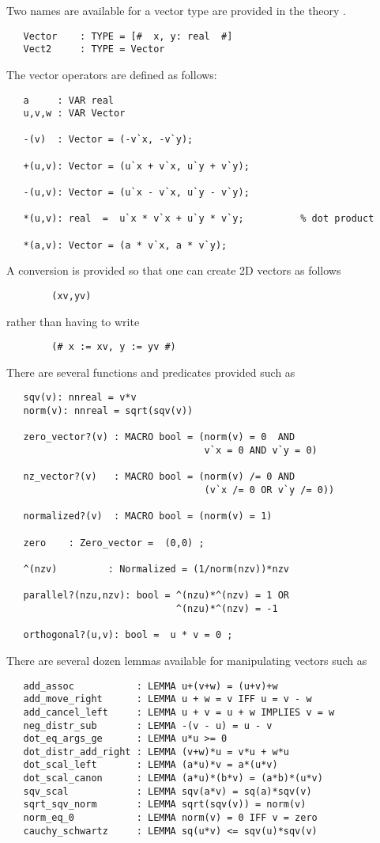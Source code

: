 \documentclass[12pt]{article}
\begin{document}
Two names are available for a vector type are provided in the theory
.
\begin{verbatim}
   Vector    : TYPE = [#  x, y: real  #]
   Vect2     : TYPE = Vector
\end{verbatim}
The vector operators are defined as follows:
\begin{verbatim}
   a     : VAR real
   u,v,w : VAR Vector

   -(v)  : Vector = (-v`x, -v`y); 

   +(u,v): Vector = (u`x + v`x, u`y + v`y);

   -(u,v): Vector = (u`x - v`x, u`y - v`y);

   *(u,v): real  =  u`x * v`x + u`y * v`y;          % dot product

   *(a,v): Vector = (a * v`x, a * v`y);
\end{verbatim}
A conversion is provided so that one can create 2D vectors as follows
\begin{verbatim}
        (xv,yv)
\end{verbatim}
rather than having to write
\begin{verbatim}
        (# x := xv, y := yv #)
\end{verbatim}
There are several functions and predicates provided such as
\begin{verbatim}
   sqv(v): nnreal = v*v
   norm(v): nnreal = sqrt(sqv(v))

   zero_vector?(v) : MACRO bool = (norm(v) = 0  AND 
                                   v`x = 0 AND v`y = 0)     

   nz_vector?(v)   : MACRO bool = (norm(v) /= 0 AND 
                                   (v`x /= 0 OR v`y /= 0))  

   normalized?(v)  : MACRO bool = (norm(v) = 1)
 
   zero    : Zero_vector =  (0,0) ;

   ^(nzv)         : Normalized = (1/norm(nzv))*nzv          

   parallel?(nzu,nzv): bool = ^(nzu)*^(nzv) = 1 OR  
                              ^(nzu)*^(nzv) = -1

   orthogonal?(u,v): bool =  u * v = 0 ;
\end{verbatim}
There are several dozen lemmas available for manipulating vectors
such as
\begin{verbatim} 
   add_assoc           : LEMMA u+(v+w) = (u+v)+w
   add_move_right      : LEMMA u + w = v IFF u = v - w
   add_cancel_left     : LEMMA u + v = u + w IMPLIES v = w   
   neg_distr_sub       : LEMMA -(v - u) = u - v
   dot_eq_args_ge      : LEMMA u*u >= 0
   dot_distr_add_right : LEMMA (v+w)*u = v*u + w*u
   dot_scal_left       : LEMMA (a*u)*v = a*(u*v)
   dot_scal_canon      : LEMMA (a*u)*(b*v) = (a*b)*(u*v)   
   sqv_scal            : LEMMA sqv(a*v) = sq(a)*sqv(v)
   sqrt_sqv_norm       : LEMMA sqrt(sqv(v)) = norm(v)
   norm_eq_0           : LEMMA norm(v) = 0 IFF v = zero
   cauchy_schwartz     : LEMMA sq(u*v) <= sqv(u)*sqv(v)
\end{verbatim}
\end{document}
